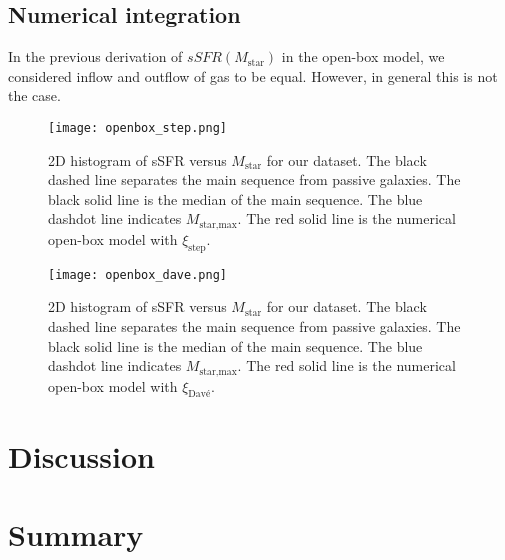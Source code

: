\documentclass[fleqn,usenatbib]{mnras}
\begin{document}
\subsection{Numerical integration}\label{sec:numerical_integration}
In the previous derivation of $sSFR\left(M_{\text{star}}\right)$ in the open-box model, we considered inflow and outflow of gas to be equal. However, in general this is not the case.

\begin{figure}\centering
	\texttt{[image: openbox\_step.png]}
    \caption{2D histogram of sSFR versus $M_{\text{star}}$ for our dataset. The black dashed line separates the main sequence from passive galaxies. The black solid line is the median of the main sequence. The blue dashdot line indicates $M_{\text{star,max}}$. The red solid line is the numerical open-box model with $\xi_\text{step}$.}
    \label{fig:openbox_step}
\end{figure}

\begin{figure}\centering
	\texttt{[image: openbox\_dave.png]}
    \caption{2D histogram of sSFR versus $M_{\text{star}}$ for our dataset. The black dashed line separates the main sequence from passive galaxies. The black solid line is the median of the main sequence. The blue dashdot line indicates $M_{\text{star,max}}$. The red solid line is the numerical open-box model with $\xi_\text{Davé}$.}
    \label{fig:openbox_dave}
\end{figure}



\section{Discussion}\label{sec:discussion}




\section{Summary}\label{sec:summary}






 


\label{lastpage}
\end{document}
